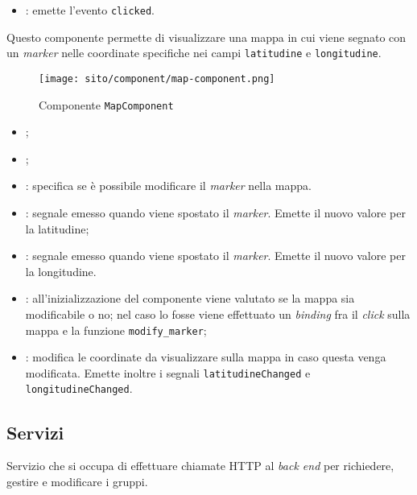 \begin{itemize}
    \item {}: emette l'evento \texttt{clicked}. 
\end{itemize}


\label{par:MapComponent}
Questo componente permette di visualizzare una mappa in cui viene segnato con un \textit{marker} nelle coordinate specifiche nei campi \texttt{latitudine} e \texttt{longitudine}.
\begin{figure}[H] 
    \centerline{\texttt{[image: sito/component/map-component.png]}} 
    \caption{Componente \texttt{MapComponent}}
\end{figure}

\begin{itemize}
    \item {};
    \item {};
    \item {}: specifica se è possibile modificare il \textit{marker} nella mappa.
\end{itemize}

\begin{itemize}
    \item {}: segnale emesso quando viene spostato il \textit{marker}. Emette il nuovo valore per la latitudine; 
    \item {}: segnale emesso quando viene spostato il \textit{marker}. Emette il nuovo valore per la longitudine.
\end{itemize}

\begin{itemize}
    \item {}: all'inizializzazione del componente viene valutato se la mappa sia modificabile o no; nel caso lo fosse viene effettuato un \textit{binding} fra il \textit{click} sulla mappa e la funzione \texttt{modify\_marker};
    \item {}: modifica le coordinate da visualizzare sulla mappa in caso questa venga modificata. Emette inoltre i segnali \texttt{latitudineChanged} e \texttt{longitudineChanged}.
\end{itemize}


\subsection{Servizi}
\label{par:GruppiService}
Servizio che si occupa di effettuare chiamate HTTP al \textit{back end} per richiedere, gestire e modificare i gruppi.

